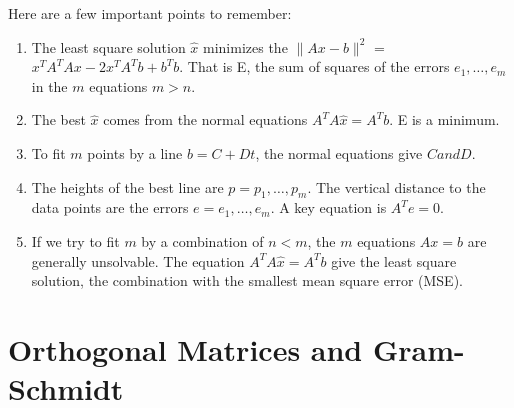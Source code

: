 Here are a few important points to remember:
\begin{enumerate}
    \item The least square solution \(\hat{x}\) minimizes the \(\lVert Ax - b \rVert^2 \) = \(x^T A^T Ax - 2x^T A^T b + b^T b\). That is E, the sum of squares of the errors \(e_1, \ldots, e_m\) in the \(m\) equations \(m > n\). 
    \item The best \(\hat{x}\) comes from the normal equations \(A^T A \hat{x} = A^T b\). E is a minimum. 
    \item To fit \(m\) points by a line \(b = C + Dt\), the normal equations give \(C and D\). 
    \item The heights of the best line are \(p = p_1, \ldots, p_m\). The vertical distance to the data points are the errors \(e = e_1, \ldots, e_m\). A key equation is \(A^T e = 0\). 
    \item If we try to fit \(m\) by a combination of \(n < m\), the \(m\) equations \(Ax = b\) are generally unsolvable. The equation \(A^T A\hat{x} = A^T b\) give the least square solution, the combination with the smallest mean square error (MSE).               
\end{enumerate}

\section{Orthogonal Matrices and Gram-Schmidt}


